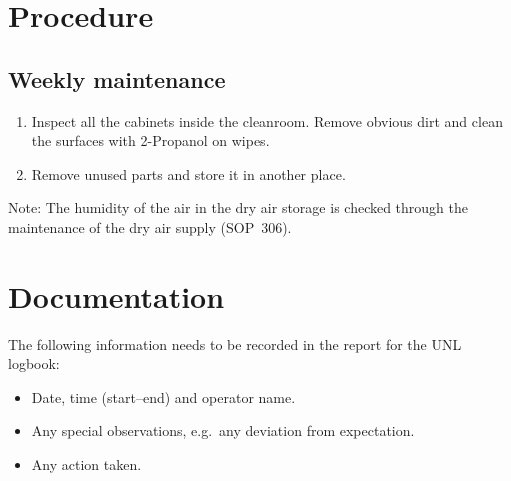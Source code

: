 \documentclass[12pt]{unlsilabsop}
\begin{document}
\section{Procedure}

\subsection{Weekly maintenance}
\begin{enumerate}
    \item Inspect all the cabinets inside the cleanroom. Remove obvious dirt and clean the surfaces with 2-Propanol on wipes.
    \item Remove unused parts and store it in another place.
\end{enumerate}
Note: The humidity of the air in the dry air storage is checked through the maintenance of the dry air supply (SOP~306).

\section{Documentation}
The following information needs to be recorded in the report for the UNL logbook:
\begin{itemize}
    \item Date, time (start--end) and operator name.
    \item Any special observations, e.g.~any deviation from expectation.
    \item Any action taken.
\end{itemize}
\end{document}
